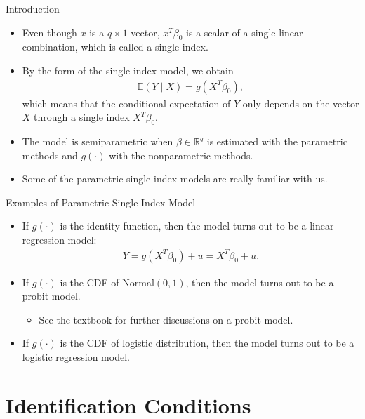 \documentclass[xcolor=svgnames,dvipdfmx,cjk]{beamer}
\theoremstyle{example}
\begin{document}
\begin{frame}{Introduction}
  \begin{itemize}
    \item Even though $x$ is a $q\times1$ vector, 
          $x^{T} \beta_0$ is a scalar of a single linear combination, 
          which is called \alert{a single index}.
    \item By the form of the single index model, we obtain
          \begin{align*}
            \mathbb{E}(Y \mid X) = g(X^{T} \beta_0),
          \end{align*}
          which means that 
          the conditional expectation of $Y$ 
          only depends on the vector $X$
          through a single index $X^{T} \beta_0$.
    \item The model is semiparametric 
          when $\beta \in \mathbb{R}^{q}$ is estimated with the parametric methods
          and $g(\cdot)$ with the nonparametric methods.
    \item Some of the parametric single index models are really familiar with us.
  \end{itemize}
\end{frame}

\begin{frame}{Examples of Parametric Single Index Model}
  \begin{itemize}
    \item If $g(\cdot)$ is the identity function, 
          then the model turns out to be \alert{a linear regression model}:
          \begin{align*}
            Y = g (X^{T} \beta_0) + u = X^{T} \beta_0 + u.
          \end{align*}
    \item If $g(\cdot)$ is the CDF of Normal$(0, 1)$,
          then the model turns out to be \alert{a probit model}.
          \begin{itemize}
            \item See the textbook for further discussions on \alert{a probit model}.
          \end{itemize}
    \item If $g(\cdot)$ is the CDF of logistic distribution,
          then the model turns out to be a logistic regression model.
  \end{itemize}
  
\end{frame}


\section{Identification Conditions}
\end{document}
